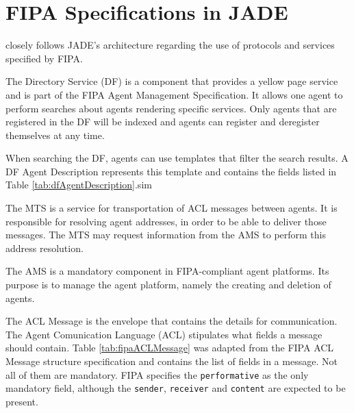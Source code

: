 \section{FIPA Specifications in JADE} %
\label{sec:fipa}

\apiname{} closely follows JADE's architecture regarding the use of protocols and services specified by FIPA. 


The Directory Service (DF) is a component that provides a yellow page service and is part of the FIPA Agent Management Specification. It allows one agent to perform searches about agents rendering specific services. Only agents that are registered in the DF will be indexed and agents can register and deregister themselves at any time.

When searching the DF, agents can use templates that filter the search results. A DF Agent Description represents this template and contains the fields listed in Table \ref{tab:dfAgentDescription}.sim


The MTS is a service for transportation of ACL messages between agents. It is responsible for resolving agent addresses, in order to be able to deliver those messages. The MTS may request information from the AMS to perform this address resolution.

The AMS is a mandatory component in FIPA-compliant agent platforms. Its purpose is to manage the agent platform, namely the creating and deletion of agents.

The ACL Message is the envelope that contains the details for communication. The Agent Comunication Language (ACL) stipulates what fields a message should contain. Table \ref{tab:fipaACLMessage} was adapted from the FIPA ACL Message structure specification and contains the list of fields in a message. Not all of them are mandatory. FIPA specifies the \texttt{performative} as the only mandatory field, although the \texttt{sender}, \texttt{receiver} and \texttt{content} are expected to be present.

